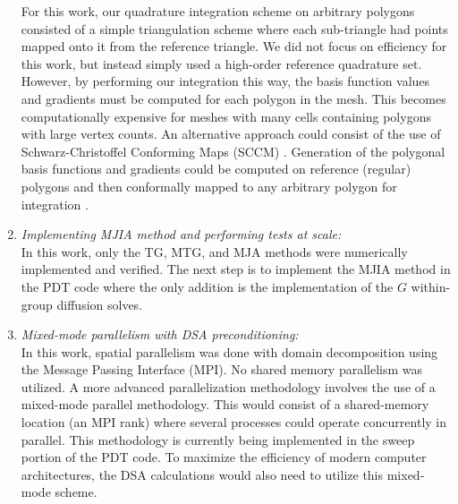 \begin{enumerate}
For this work, our quadrature integration scheme on arbitrary polygons consisted of a simple triangulation scheme where each sub-triangle had points mapped onto it from the reference triangle. We did not focus on efficiency for this work, but instead simply used a high-order reference quadrature set. However, by performing our integration this way, the basis function values and gradients must be computed for each polygon in the mesh. This becomes computationally expensive for meshes with many cells containing polygons with large vertex counts. An alternative approach could consist of the use of Schwarz-Christoffel Conforming Maps (SCCM) \cite{driscoll2002schwarz,driscoll2005algorithm}. Generation of the polygonal basis functions and gradients could be computed on reference (regular) polygons and then conformally mapped to any arbitrary polygon for integration \cite{natarajan2009numerical}.
\item {\em Implementing MJIA method and performing tests at scale:} \\
In this work, only the TG, MTG, and MJA methods were numerically implemented and verified. The next step is to implement the MJIA method in the PDT code where the only addition is the implementation of the $G$ within-group diffusion solves. 
\item {\em Mixed-mode parallelism with DSA preconditioning:} \\
In this work, spatial parallelism was done with domain decomposition using the Message Passing Interface (MPI). No shared memory parallelism was utilized. A more advanced parallelization methodology involves the use of a mixed-mode parallel methodology. This would consist of a shared-memory location (an MPI rank) where several processes could operate concurrently in parallel. This methodology is currently being implemented in the sweep portion of the PDT code. To maximize the efficiency of modern computer architectures, the DSA calculations would also need to utilize this mixed-mode scheme.
\end{enumerate}